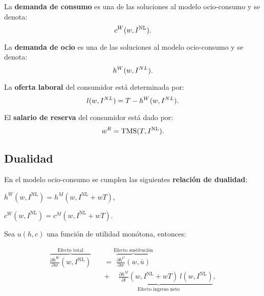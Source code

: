 \documentclass[8pt,a4paper]{extarticle}
\begin{document}
\begin{multicols}{3}
\begin{boxdef}
	La \textbf{demanda de consumo} es una de las soluciones al modelo ocio-consumo y se denota:
	\[
		c^W(w, I^{\text{\normalfont NL}})
	.\] 
\end{boxdef}

\begin{boxdef}
	La \textbf{demanda de ocio} es una de las soluciones al modelo ocio-consumo y se denota:
	\[
		h^W(w, I^{\normalfont NL})
	.\] 
\end{boxdef}

\begin{boxdef}
	La \textbf{oferta laboral} del consumidor está determinada por:
	\[
		l(w, I^{\normalfont NL}) = T - h^W(w, I^{\normalfont NL})
	.\] 
\end{boxdef}

\begin{boxdef}
	El \textbf{salario de reserva} del consumidor está dado por:
	\[
		w^R = \text{\normalfont TMS} (T, I^{\text{\normalfont NL}})
	.\] 
\end{boxdef}

\sectionbreak

\subsection{Dualidad}

En el modelo ocio-consumo se cumplen las siguientes \textbf{relación de dualidad}:

\begin{eqlist}
\item $h^W(w, I^{\text{NL}}) = h^M (w, I^{\text{NL}} + wT)$,
\item $c^W(w, I^{\text{NL}}) = c^M (w, I^{\text{NL}} + wT)$.
\end{eqlist}

\begin{boxtheo}
	Sea $u(h, c)$ una función de utilidad monótona, entonces:
	
	\begin{equation*}
	\begin{aligned}
		\overbrace{\frac{\partial h^W}{\partial w} (w, I^{\text{NL}})}^{\text{Efecto total}} \quad &= \overbrace{\frac{\partial h^C}{\partial w} (w, \bar{u})}^{\text{Efecto sustitución}} \\
																						   & \underbrace{ + \quad\ \frac{\partial h^M}{\partial l} (w, I^{\text{NL}} + wT)\ l (w, I^{\text{NL}})}_{\text{Efecto ingreso neto}},
	\end{aligned}
	\end{equation*}
	

\end{boxtheo}
\end{multicols}
\end{document}
